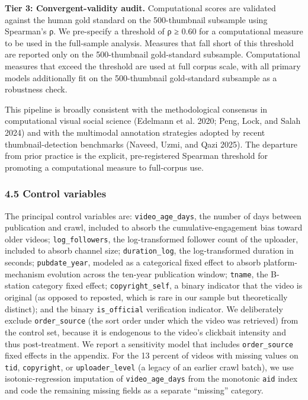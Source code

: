 \documentclass[
  12pt,
]{article}
\begin{document}
\textbf{Tier 3: Convergent-validity audit.} Computational scores are
validated against the human gold standard on the 500-thumbnail subsample
using Spearman's ρ. We pre-specify a threshold of ρ ≥ 0.60 for a
computational measure to be used in the full-sample analysis. Measures
that fall short of this threshold are reported only on the 500-thumbnail
gold-standard subsample. Computational measures that exceed the
threshold are used at full corpus scale, with all primary models
additionally fit on the 500-thumbnail gold-standard subsample as a
robustness check.

This pipeline is broadly consistent with the methodological consensus in
computational visual social science (Edelmann et al. 2020; Peng, Lock,
and Salah 2024) and with the multimodal annotation strategies adopted by
recent thumbnail-detection benchmarks (Naveed, Uzmi, and Qazi 2025). The
departure from prior practice is the explicit, pre-registered Spearman
threshold for promoting a computational measure to full-corpus use.

\subsubsection{4.5 Control variables}\label{control-variables}

The principal control variables are: \texttt{video\_age\_days}, the
number of days between publication and crawl, included to absorb the
cumulative-engagement bias toward older videos; \texttt{log\_followers},
the log-transformed follower count of the uploader, included to absorb
channel size; \texttt{duration\_log}, the log-transformed duration in
seconds; \texttt{pubdate\_year}, modeled as a categorical fixed effect
to absorb platform-mechanism evolution across the ten-year publication
window; \texttt{tname}, the B-station category fixed effect;
\texttt{copyright\_self}, a binary indicator that the video is original
(as opposed to reposted, which is rare in our sample but theoretically
distinct); and the binary \texttt{is\_official} verification indicator.
We deliberately exclude \texttt{order\_source} (the sort order under
which the video was retrieved) from the control set, because it is
endogenous to the video's clickbait intensity and thus post-treatment.
We report a sensitivity model that includes \texttt{order\_source} fixed
effects in the appendix. For the 13 percent of videos with missing
values on \texttt{tid}, \texttt{copyright}, or \texttt{uploader\_level}
(a legacy of an earlier crawl batch), we use isotonic-regression
imputation of \texttt{video\_age\_days} from the monotonic \texttt{aid}
index and code the remaining missing fields as a separate ``missing''
category.
\end{document}
